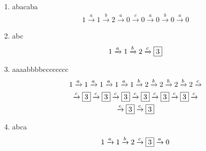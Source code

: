 \documentclass[12pt]{article}
\begin{document}
 
\begin {enumerate} 
\item abacaba
\begin {equation*} 
\begin {gathered} 
1 \xrightarrow{a} 1 \xrightarrow{b} 2 \xrightarrow{a} 0 \xrightarrow{c} 0 \xrightarrow{a} 0 \xrightarrow{b} 0 \xrightarrow{a} 0
\end {gathered} 
\end {equation*} 
\item abc
\begin {equation*} 
\begin {gathered} 
1 \xrightarrow{a} 1 \xrightarrow{b} 2 \xrightarrow{c} \fbox{3}
\end {gathered} 
\end {equation*} 
\item aaaabbbbcccccccc
\begin {equation*} 
\begin {gathered} 
1 \xrightarrow{a} 1 \xrightarrow{a} 1 \xrightarrow{a} 1 \xrightarrow{a} 1 \xrightarrow{b} 2 \xrightarrow{b} 2 \xrightarrow{b} 2 \xrightarrow{b} 2 \xrightarrow{c} \\
 \xrightarrow{c} \fbox{3} \xrightarrow{c} \fbox{3} \xrightarrow{c} \fbox{3} \xrightarrow{c} \fbox{3} \xrightarrow{c} \fbox{3} \xrightarrow{c} \fbox{3} \xrightarrow{c} \\
 \xrightarrow{c} \fbox{3} \xrightarrow{c} \fbox{3}
\end {gathered} 
\end {equation*} 
\item abca
\begin {equation*} 
\begin {gathered} 
1 \xrightarrow{a} 1 \xrightarrow{b} 2 \xrightarrow{c} \fbox{3} \xrightarrow{a} 0
\end {gathered} 
\end {equation*} 
\end {enumerate}
\end{document}
